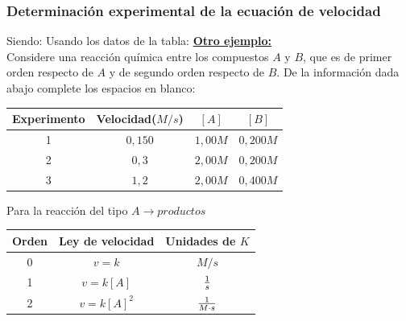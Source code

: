     \subsubsection{Determinación experimental de la ecuación de velocidad}
    Siendo:   Usando los datos de la tabla:  
        \textbf{\underline{Otro ejemplo:}} \\[2pt] \sangria{} Considere una reacción química entre los compuestos $A$ y $B$, que es de primer orden respecto de $A$ y de segundo orden respecto de $B$. De la información dada abajo complete los espacios en blanco:  \begin{center} \begin{tabular}{|m{2cm}|m{2cm}|m{1cm}|m{1cm}|} \toprule \multicolumn{1}{|c}{Experimento} & \multicolumn{1}{c}{Velocidad($M/s$)} & \multicolumn{1}{c}{$[A]$} & \multicolumn{1}{c|}{$[B]$} \\ \midrule \multicolumn{1}{|c}{1} & \multicolumn{1}{c}{$0,150$} & \multicolumn{1}{c}{$1,00M$} & \multicolumn{1}{c|}{$0,200M$} \\ \multicolumn{1}{|c}{2} & \multicolumn{1}{c}{$0,3$} & \multicolumn{1}{c}{$2,00M$} & \multicolumn{1}{c|}{$0,200M$} \\ \multicolumn{1}{|c}{3} & \multicolumn{1}{c}{$1,2$} & \multicolumn{1}{c}{$2,00M$} & \multicolumn{1}{c|}{$0,400M$} \\ \bottomrule \end{tabular} \end{center}   
         Para la reacción del tipo $A \rightarrow productos$  \begin{center} \begin{tabular}{|c|c|c|} \toprule \multicolumn{1}{|c}{\textbf{Orden}} & \multicolumn{1}{c}{\textbf{Ley de velocidad}} & \multicolumn{1}{c|}{\textbf{Unidades de $K$}} \\ \midrule \multicolumn{1}{|c}{0} & \multicolumn{1}{c}{$v = k$} & \multicolumn{1}{c|}{$M/s$} \\[5pt] \multicolumn{1}{|c}{1} & \multicolumn{1}{c}{$v = k[A]$} & \multicolumn{1}{c|}{$\frac{1}{s}$} \\[5pt] \multicolumn{1}{|c}{2} & \multicolumn{1}{c}{$v = k[A]^2$} & \multicolumn{1}{c|}{$\frac{1}{M\cdot s}$} \\[5pt] \bottomrule \end{tabular} \end{center}
        \columnbreak{}
